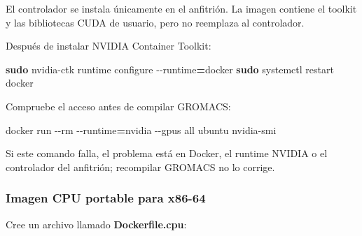 \documentclass[
  spanish,
  11pt,
  a4paper]{article}
\newenvironment{Shaded}{\begin{snugshade}}{\end{snugshade}}
\newcommand{\AttributeTok}[1]{\textcolor[rgb]{0.13,0.29,0.53}{#1}}
\newcommand{\ExtensionTok}[1]{#1}
\newcommand{\FunctionTok}[1]{\textcolor[rgb]{0.13,0.29,0.53}{\textbf{#1}}}
\newcommand{\NormalTok}[1]{#1}
\newcommand{\OperatorTok}[1]{\textcolor[rgb]{0.81,0.36,0.00}{\textbf{#1}}}
\begin{document}
El controlador se instala únicamente en el anfitrión. La imagen contiene
el toolkit y las bibliotecas CUDA de usuario, pero no reemplaza al
controlador.

Después de instalar NVIDIA Container Toolkit:

\begin{Shaded}
\begin{Highlighting}[]
\FunctionTok{sudo}\NormalTok{ nvidia{-}ctk runtime configure }\AttributeTok{{-}{-}runtime}\OperatorTok{=}\NormalTok{docker}
\FunctionTok{sudo}\NormalTok{ systemctl restart docker}
\end{Highlighting}
\end{Shaded}

Compruebe el acceso antes de compilar GROMACS:

\begin{Shaded}
\begin{Highlighting}[]
\ExtensionTok{docker}\NormalTok{ run }\AttributeTok{{-}{-}rm} \AttributeTok{{-}{-}runtime}\OperatorTok{=}\NormalTok{nvidia }\AttributeTok{{-}{-}gpus}\NormalTok{ all ubuntu nvidia{-}smi}
\end{Highlighting}
\end{Shaded}

Si este comando falla, el problema está en Docker, el runtime NVIDIA o
el controlador del anfitrión; recompilar GROMACS no lo corrige.

\subsubsection{Imagen CPU portable para
x86-64}\label{imagen-cpu-portable-para-x86-64}

Cree un archivo llamado \textbf{Dockerfile.cpu}:
\end{document}
